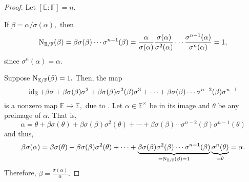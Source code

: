 \hilbertmultiplicative*\label{thm:hilbertmultiplicative2}
\begin{flushright}\hyperref[thm:hilbertmultiplicative]{\upsym}\end{flushright}
\begin{proof}
    Let $[\mathbb{E} : \mathbb{F}] = n.$

    \backward If $\beta = \alpha/\sigma(\alpha),$ then
    \begin{equation*} 
        \operatorname{N}_{\mathbb{E}/\mathbb{F}}(\beta) = \beta \sigma(\beta) \cdots \sigma^{n - 1}(\beta) = \frac{\alpha}{\sigma(\alpha)} \frac{\sigma(\alpha)}{\sigma^2(\alpha)} \cdots \frac{\sigma^{n - 1}(\alpha)}{\sigma^n(\alpha)} = 1,
    \end{equation*}
    since $\sigma^n(\alpha) = \alpha.$

    \forward Suppose $\operatorname{N}_{\mathbb{E}/\mathbb{F}}(\beta) = 1.$ Then, the map
    \begin{equation*} 
        \operatorname{id}_{\mathbb{E}} + \beta \sigma + \beta \sigma(\beta) \sigma^2 + \beta \sigma(\beta) \sigma^2(\beta) \sigma^3 + \cdots + \beta \sigma(\beta) \cdots \sigma^{n - 2}(\beta) \sigma^{n - 1}
    \end{equation*}
    is a nonzero map $\mathbb{E} \to \mathbb{E},$ due to . Let $\alpha \in \mathbb{E}^\times$ be in its image and $\theta$ be any preimage of $\alpha.$ That is,
    \begin{equation*} 
        \alpha = \theta + \beta \sigma(\theta) + \beta \sigma(\beta) \sigma^2(\theta) + \cdots + \beta \sigma(\beta) \cdots \sigma^{n - 2}(\beta) \sigma^{n - 1}(\theta)
    \end{equation*}
    and thus,
    \begin{equation*} 
        \beta\sigma(\alpha) = \beta \sigma(\theta) + \beta \sigma(\beta) \sigma^2(\theta) + \cdots + \underbrace{\beta \sigma(\beta) \sigma^2(\beta) \cdots \sigma^{n - 1}(\beta)}_{= \operatorname{N}_{\mathbb{E}/\mathbb{F}}(\beta) = 1} \underbrace{\sigma^{n}(\theta)}_{= \theta} = \alpha.
    \end{equation*}
    Therefore, $\beta = \frac{\sigma(\alpha)}{\alpha}.$
\end{proof}

